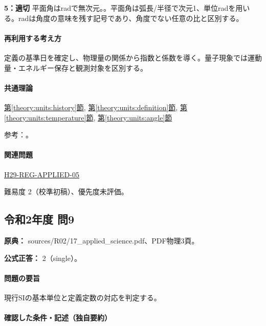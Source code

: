 \noindent\textbf{5：適切} 平面角はradで無次元。。平面角は弧長/半径で次元1、単位radを用いる。radは角度の意味を残す記号であり、角度でない任意の比と区別する。\par

\paragraph{再利用する考え方} 定義の基準日を確定し、物理量の関係から指数と係数を導く。量子現象では運動量・エネルギー保存と観測対象を区別する。

\paragraph{共通理論} \hyperref[theory:units:history]{第\ref*{theory:units:history}節}, \hyperref[theory:units:definition]{第\ref*{theory:units:definition}節}, \hyperref[theory:units:temperature]{第\ref*{theory:units:temperature}節}, \hyperref[theory:units:angle]{第\ref*{theory:units:angle}節}

\par 参考：\cite{si_cgpm2018,si_kelvin_realization,si_brochure9}。

\paragraph{関連問題} \hyperref[q:h29-reg-applied-05]{H29-REG-APPLIED-05}

\par 難易度 2（校準初稿）、優先度未評価。

\subsection{令和2年度 問9}
\label{q:r02-reg-applied-09}

\noindent\textbf{原典：} sources/R02/17\_applied\_science.pdf、PDF物理3頁。

\textbf{公式正答：} 2（single）。

\paragraph{問題の要旨} 現行SIの基本単位と定義定数の対応を判定する。

\paragraph{確認した条件・記述（独自要約）}\mbox{}\par


